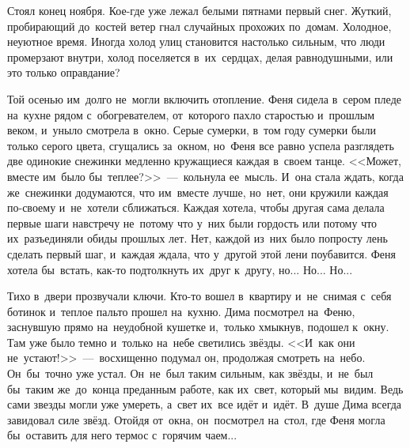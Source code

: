 \lettrine[lines=3, loversize=0.1]{С}{}тоял конец ноября.
Кое-где уже лежал белыми пятнами первый снег.
Жуткий, пробирающий до~костей ветер гнал случайных прохожих по~домам.
Холодное, неуютное время.
Иногда холод улиц становится настолько сильным, что люди промерзают внутри, холод поселяется в~их~сердцах, делая равнодушными, или это только оправдание? 

Той осенью им~долго не~могли включить отопление.
Феня сидела в~сером пледе на~кухне рядом с~обогревателем, от~которого пахло старостью и~прошлым веком, и~уныло смотрела в~окно.
Серые сумерки, в~том году сумерки были только серого цвета, сгущались за~окном, но~Феня все равно успела разглядеть две одинокие снежинки медленно кружащиеся каждая в~своем танце.
<<Может, вместе им~было бы~теплее?>>~---~кольнула ее~мысль.
И~она стала ждать, когда же~снежинки додумаются, что им~вместе лучше, но~нет, они кружили каждая по-своему и~не~хотели сближаться.
Каждая хотела, чтобы другая сама делала первые шаги навстречу не~потому что у~них были гордость или потому что их~разъединяли обиды прошлых лет.
Нет, каждой из~них было попросту лень сделать первый шаг, и~каждая ждала, что у~другой этой лени поубавится.
Феня хотела бы~встать, как-то подтолкнуть их~друг к~другу, но... Но... Но...
 
Тихо в~двери прозвучали ключи.
Кто-то вошел в~квартиру и~не~снимая с~себя ботинок и~теплое пальто прошел на~кухню.
Дима посмотрел на~Феню, заснувшую прямо на~неудобной кушетке и,~только хмыкнув, подошел к~окну.
Там уже было темно и~только на~небе светились звёзды.
<<И~как они не~устают!>>~---~восхищенно подумал он, продолжая смотреть на~небо.
Он~бы~точно уже устал.
Он~не~был таким сильным, как звёзды, и~не~был бы~таким же~до~конца преданным работе, как их~свет, который мы~видим.
Ведь сами звезды могли уже умереть, а~свет их~все идёт и~идёт.
В~душе Дима всегда завидовал силе звёзд.
Отойдя от~окна, он~посмотрел на~стол, где Феня могла бы~оставить для него термос с~горячим чаем...
 
